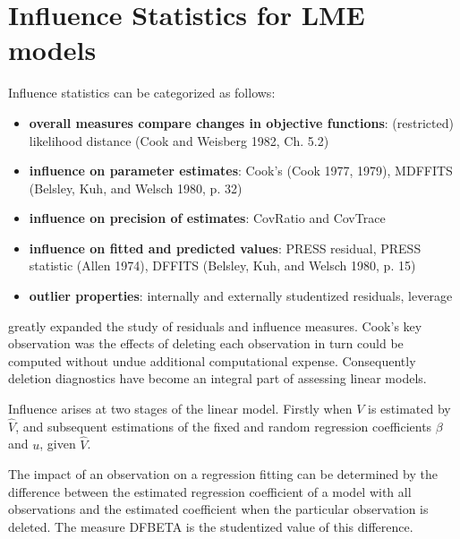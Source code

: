 \documentclass[12pt, a4paper]{report}
\theoremstyle{plain}
\theoremstyle{definition}
\theoremstyle{remark}
\begin{document}



\section{Influence Statistics for LME models} %
Influence statistics can be categorized as follows:
\begin{itemize}
	\item \textbf{overall measures compare changes in objective functions}: (restricted) likelihood distance (Cook and Weisberg 1982, Ch. 5.2)
	\item \textbf{influence on parameter estimates}: Cook's  (Cook 1977, 1979), MDFFITS (Belsley, Kuh, and Welsch 1980, p. 32)
	\item \textbf{influence on precision of estimates}: CovRatio and CovTrace
	\item \textbf{influence on fitted and predicted values}: PRESS residual, PRESS statistic (Allen 1974), DFFITS (Belsley, Kuh, and Welsch 1980, p. 15)
	\item \textbf{outlier properties}: internally and externally studentized residuals, leverage
\end{itemize}



\citet{cook77} greatly expanded the study of residuals and influence measures. Cook's key observation was the effects of deleting each observation in turn could be computed without undue additional computational expense. Consequently deletion diagnostics have become an integral part of assessing linear models.

Influence arises at two stages of the linear model. Firstly when $V$ is estimated by $\hat{V}$, and subsequent
estimations of the fixed and random regression coefficients $\beta$ and $u$, given $\hat{V}$.

The impact of an observation on a regression fitting can be determined by the difference between the estimated regression coefficient of a model with all observations and the estimated coefficient when the particular observation is deleted. The measure DFBETA is the studentized value of this difference.
\end{document}
